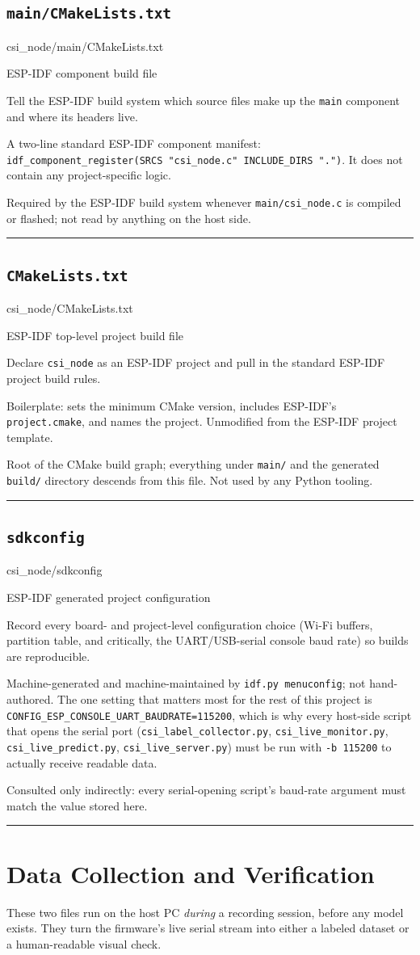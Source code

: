 \documentclass[11pt,a4paper]{article}
\newcommand{\filepath}[1]{{\small\ttfamily\color{pathgray}#1}}
\newcommand{\fileentry}[6]{%
    \subsection{\texttt{#1}}
    \filepath{#2}
    \vspace{0.15cm}
    \begin{description}[leftmargin=2.6cm, style=nextline]
        \item[Type] #3
        \item[Objective] #4
        \item[Role] #5
        \item[Connections] #6
    \end{description}
    \vspace{0.2cm}
    \hrule
    \vspace{0.3cm}
}
\begin{document}
\fileentry
{main/CMakeLists.txt}
{csi\_node/main/CMakeLists.txt}
{ESP-IDF component build file}
{Tell the ESP-IDF build system which source files make up the
    \texttt{main} component and where its headers live.}
{A two-line standard ESP-IDF component manifest:
    \texttt{idf\_component\_register(SRCS "csi\_node.c" INCLUDE\_DIRS ".")}.
    It does not contain any project-specific logic.}
{Required by the ESP-IDF build system whenever \texttt{main/csi\_node.c}
    is compiled or flashed; not read by anything on the host side.}

\fileentry
{CMakeLists.txt}
{csi\_node/CMakeLists.txt}
{ESP-IDF top-level project build file}
{Declare \texttt{csi\_node} as an ESP-IDF project and pull in the
    standard ESP-IDF project build rules.}
{Boilerplate: sets the minimum CMake version, includes ESP-IDF's
    \texttt{project.cmake}, and names the project. Unmodified from the
    ESP-IDF project template.}
{Root of the CMake build graph; everything under \texttt{main/} and the
    generated \texttt{build/} directory descends from this file. Not
    used by any Python tooling.}

\fileentry
{sdkconfig}
{csi\_node/sdkconfig}
{ESP-IDF generated project configuration}
{Record every board- and project-level configuration choice (Wi-Fi
    buffers, partition table, and critically, the UART/USB-serial
    console baud rate) so builds are reproducible.}
{Machine-generated and machine-maintained by \texttt{idf.py menuconfig};
    not hand-authored. The one setting that matters most for the rest of
    this project is
    \texttt{CONFIG\_ESP\_CONSOLE\_UART\_BAUDRATE=115200}, which is why
    every host-side script that opens the serial port
    (\texttt{csi\_label\_collector.py}, \texttt{csi\_live\_monitor.py},
    \texttt{csi\_live\_predict.py}, \texttt{csi\_live\_server.py}) must be
    run with \texttt{-b 115200} to actually receive readable data.}
{Consulted only indirectly: every serial-opening script's baud-rate
    argument must match the value stored here.}

\section{Data Collection and Verification}

These two files run on the host PC \emph{during} a recording session,
before any model exists. They turn the firmware's live serial stream
into either a labeled dataset or a human-readable visual check.
\end{document}
